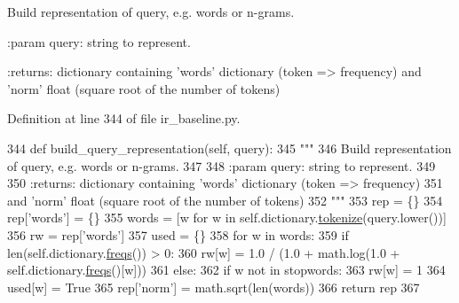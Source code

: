\begin{DoxyVerb}Build representation of query, e.g. words or n-grams.

:param query: string to represent.

:returns: dictionary containing 'words' dictionary (token => frequency)
  and 'norm' float (square root of the number of tokens)
\end{DoxyVerb}
 

Definition at line 344 of file ir\+\_\+baseline.\+py.


\begin{DoxyCode}
344     \textcolor{keyword}{def }build\_query\_representation(self, query):
345         \textcolor{stringliteral}{"""}
346 \textcolor{stringliteral}{        Build representation of query, e.g. words or n-grams.}
347 \textcolor{stringliteral}{}
348 \textcolor{stringliteral}{        :param query: string to represent.}
349 \textcolor{stringliteral}{}
350 \textcolor{stringliteral}{        :returns: dictionary containing 'words' dictionary (token => frequency)}
351 \textcolor{stringliteral}{                  and 'norm' float (square root of the number of tokens)}
352 \textcolor{stringliteral}{        """}
353         rep = \{\}
354         rep[\textcolor{stringliteral}{'words'}] = \{\}
355         words = [w \textcolor{keywordflow}{for} w \textcolor{keywordflow}{in} self.dictionary.\hyperlink{namespaceparlai_1_1agents_1_1tfidf__retriever_1_1build__tfidf_a1fdb457e98eb4e4c26047e229686a616}{tokenize}(query.lower())]
356         rw = rep[\textcolor{stringliteral}{'words'}]
357         used = \{\}
358         \textcolor{keywordflow}{for} w \textcolor{keywordflow}{in} words:
359             \textcolor{keywordflow}{if} len(self.dictionary.\hyperlink{namespaceparlai_1_1agents_1_1tfidf__retriever_1_1build__tfidf_abb3607652abdd76d57a6ae90e19e3828}{freqs}()) > 0:
360                 rw[w] = 1.0 / (1.0 + math.log(1.0 + self.dictionary.\hyperlink{namespaceparlai_1_1agents_1_1tfidf__retriever_1_1build__tfidf_abb3607652abdd76d57a6ae90e19e3828}{freqs}()[w]))
361             \textcolor{keywordflow}{else}:
362                 \textcolor{keywordflow}{if} w \textcolor{keywordflow}{not} \textcolor{keywordflow}{in} stopwords:
363                     rw[w] = 1
364             used[w] = \textcolor{keyword}{True}
365         rep[\textcolor{stringliteral}{'norm'}] = math.sqrt(len(words))
366         \textcolor{keywordflow}{return} rep
367 \end{DoxyCode}
\mbox{\label{classparlai_1_1agents_1_1ir__baseline_1_1ir__baseline_1_1IrBaselineAgent_a3701001e1de9bcc2d110a318799101c1}} 

